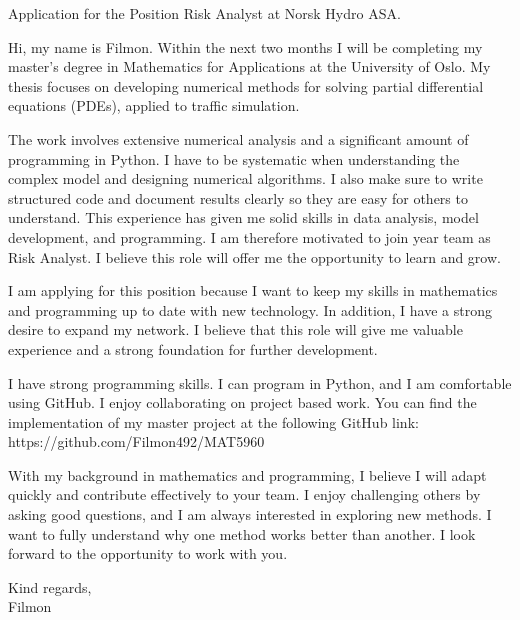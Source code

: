 \documentclass{article}
\begin{document}
Application for the Position Risk Analyst at
Norsk Hydro ASA.

Hi, my name is Filmon. Within the next two months I will be completing my master's degree in Mathematics for Applications at the University of Oslo. My thesis focuses on developing numerical methods for solving partial differential equations (PDEs), applied to traffic simulation.

The work involves extensive numerical analysis and a significant amount of programming in Python. I have to be systematic when understanding the complex model and designing numerical algorithms. I also make sure to write structured code and document results clearly so they are easy for others to understand. This experience has given me solid skills in data analysis, model development, and programming. I am therefore motivated to join year team as Risk Analyst. I believe this role will offer me the opportunity to learn and grow.

I am applying for this position because I want to keep my skills in mathematics and programming up to date with new technology. In addition, I have a strong desire to expand my network. I believe that this role will give me valuable experience and a strong foundation for further development.

I have strong programming skills. I can program in Python, and I am comfortable using GitHub. I enjoy collaborating on project based work. You can find the implementation of my master project at the following GitHub link:
https://github.com/Filmon492/MAT5960

With my background in mathematics and programming, I believe I will adapt quickly and contribute effectively to your team. I enjoy challenging others by asking good questions, and I am always interested in exploring new methods. I want to fully understand why one method works better than another. I look forward to the opportunity to work with you.

Kind regards,\\
Filmon




\end{document}
